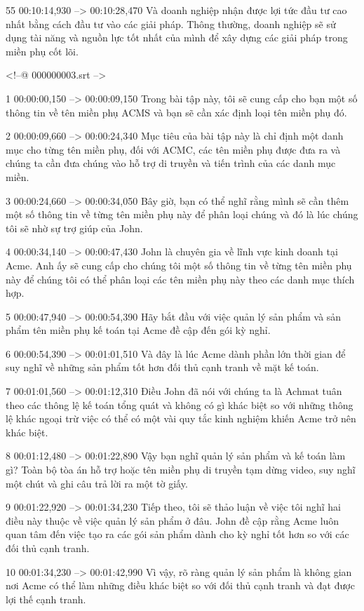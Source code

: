 55
00:10:14,930 --> 00:10:28,470
Và doanh nghiệp nhận được lợi tức đầu tư cao nhất bằng cách đầu tư vào các giải pháp.  Thông thường, doanh nghiệp sẽ sử dụng tài năng và nguồn lực tốt nhất của mình để xây dựng các giải pháp trong miền phụ cốt lõi.

<!--@ 000000003.srt -->

1
00:00:00,150 --> 00:00:09,150
Trong bài tập này, tôi sẽ cung cấp cho bạn một số thông tin về tên miền phụ ACMS và bạn sẽ cần xác định loại tên miền phụ đó.

2
00:00:09,660 --> 00:00:24,340
Mục tiêu của bài tập này là chỉ định một danh mục cho từng tên miền phụ, đối với ACMC, các tên miền phụ được đưa ra và chúng ta cần đưa chúng vào hỗ trợ di truyền và tiến trình của các danh mục miền.

3
00:00:24,660 --> 00:00:34,050
Bây giờ, bạn có thể nghĩ rằng mình sẽ cần thêm một số thông tin về từng tên miền phụ này để phân loại chúng và đó là lúc chúng tôi sẽ nhờ sự trợ giúp của John.

4
00:00:34,140 --> 00:00:47,430
John là chuyên gia về lĩnh vực kinh doanh tại Acme.  Anh ấy sẽ cung cấp cho chúng tôi một số thông tin về từng tên miền phụ này để chúng tôi có thể phân loại các tên miền phụ này theo các danh mục thích hợp.

5
00:00:47,940 --> 00:00:54,390
Hãy bắt đầu với việc quản lý sản phẩm và sản phẩm tên miền phụ kế toán tại Acme đề cập đến gói kỳ nghỉ.

6
00:00:54,390 --> 00:01:01,510
Và đây là lúc Acme dành phần lớn thời gian để suy nghĩ về những sản phẩm tốt hơn đối thủ cạnh tranh về mặt kế toán.

7
00:01:01,560 --> 00:01:12,310
Điều John đã nói với chúng ta là Achmat tuân theo các thông lệ kế toán tổng quát và không có gì khác biệt so với những thông lệ khác ngoại trừ việc có thể có một vài quy tắc kinh nghiệm khiến Acme trở nên khác biệt.

8
00:01:12,480 --> 00:01:22,890
Vậy bạn nghĩ quản lý sản phẩm và kế toán làm gì?  Toàn bộ tòa án hỗ trợ hoặc tên miền phụ di truyền tạm dừng video, suy nghĩ một chút và ghi câu trả lời ra một tờ giấy.

9
00:01:22,920 --> 00:01:34,230
Tiếp theo, tôi sẽ thảo luận về việc tôi nghĩ hai điều này thuộc về việc quản lý sản phẩm ở đâu.  John đề cập rằng Acme luôn quan tâm đến việc tạo ra các gói sản phẩm dành cho kỳ nghỉ tốt hơn so với các đối thủ cạnh tranh.

10
00:01:34,230 --> 00:01:42,990
Vì vậy, rõ ràng quản lý sản phẩm là không gian nơi Acme có thể làm những điều khác biệt so với đối thủ cạnh tranh và đạt được lợi thế cạnh tranh.

